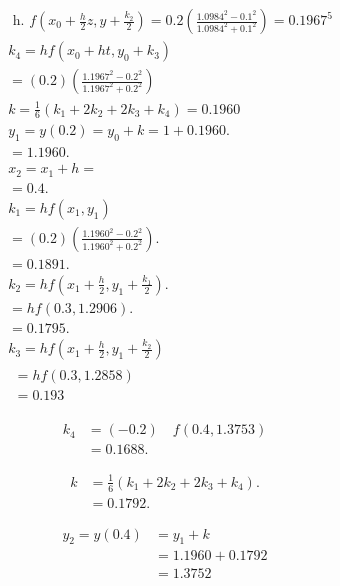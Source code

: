 \documentclass[12pt]{exam}
\begin{document}
\begin{questions}
\begin{parts}
\begin{solution}
        $$
        \begin{aligned}
        & \text { h. } f\left(x_{0}+\frac{h}{2} z, y+\frac{k_{2}}{2}\right)=0.2\left(\frac{1.0984^{2}-0.1^{2}}{1.0984^{2}+0.1^{2}}\right)=0.1967^{5} \\
        & k_{4}=h f\left(x_{0}+h t, y_{0}+k_{3}\right) \\
        & =(0.2)\left(\frac{1.1967^{2}-0.2^{2}}{1.1967^{2}+0.2^{2}}\right) \\
        & k=\frac{1}{6}\left(k_{1}+2 k_{2}+2 k_{3}+k_{4}\right)=0.1960 \\
        & y_{1}=y(0.2)=y_{0}+k=1+0.1960 . \\
        & =1.1960 . \\
        & x_{2}=x_{1}+h= \\
        & =0.4 \text {. } \\
        & k_{1}=h f\left(x_{1}, y_{1}\right) \\
        & =(0.2)\left(\frac{1.1960^{2}-0.2^{2}}{1.1960^{2}+0.2^{2}}\right) \text {. } \\
        & =0.1891 . \\
        & k_{2}=h f\left(x_{1}+\frac{h}{2}, y_{1}+\frac{k_{1}}{2}\right) \text {. } \\
        & =h f(0.3,1.2906) . \\
        & =0.1795 \text {. } \\
        & k_{3}=h f\left(x_{1}+\frac{h}{2}, y_{1}+\frac{k_{2}}{2}\right) \\
        & \begin{array}{l}
        =h f(0.3,1.2858) \\
        =0.193
        \end{array}
        \end{aligned}
        $$
        
        $$
        \begin{aligned}
        k_{4} & =(-0.2) \quad f(0.4,1.3753) \\
        & =0.1688 .
        \end{aligned}
        $$
        
        $$
        \begin{aligned}
        k & =\frac{1}{6}\left(k_{1}+2 k_{2}+2 k_{3}+k_{4}\right) . \\
        & =0.1792 .
        \end{aligned}
        $$
        
        $$
        \begin{aligned}
        y_{2}=y(0.4) & =y_{1}+k \\
        & =1.1960+0.1792 \\
        & =1.3752
        \end{aligned}
        $$
        

\end{solution}
\end{parts}
\end{questions}
\end{document}
